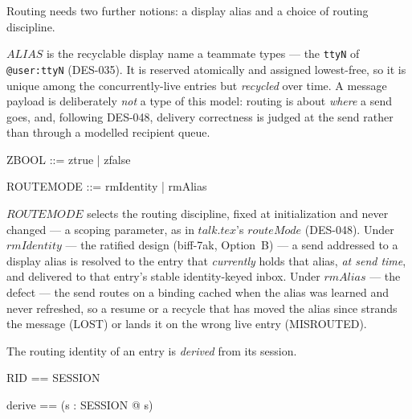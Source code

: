 \documentclass[a4paper,10pt,fleqn]{article}
\begin{document}
Routing needs two further notions: a display alias and a choice of
routing discipline.

\begin{zed}
  [ALIAS]
\end{zed}

$ALIAS$ is the recyclable display name a teammate types --- the
\texttt{ttyN} of \texttt{@user:ttyN} (DES-035).  It is reserved
atomically and assigned lowest-free, so it is unique among the
concurrently-live entries but \emph{recycled} over time.  A message
payload is deliberately \emph{not} a type of this model: routing is about
\emph{where} a send goes, and, following DES-048, delivery correctness is
judged at the send rather than through a modelled recipient queue.

\begin{zed}
  ZBOOL ::= ztrue | zfalse
\end{zed}

\begin{zed}
  ROUTEMODE ::= rmIdentity | rmAlias
\end{zed}

$ROUTEMODE$ selects the routing discipline, fixed at initialization and
never changed --- a scoping parameter, as in $talk.tex$'s $routeMode$
(DES-048).  Under $rmIdentity$ --- the ratified design (biff-7ak,
Option~B) --- a send addressed to a display alias is resolved to the
entry that \emph{currently} holds that alias, \emph{at send time}, and
delivered to that entry's stable identity-keyed inbox.  Under $rmAlias$
--- the defect --- the send routes on a binding cached when the alias was
learned and never refreshed, so a resume or a recycle that has moved the
alias since strands the message (LOST) or lands it on the wrong live
entry (MISROUTED).

The routing identity of an entry is \emph{derived} from its session.

\begin{zed}
  RID == SESSION
\end{zed}

\begin{zed}
  derive == (\lambda s : SESSION @ s)
\end{zed}
\end{document}
